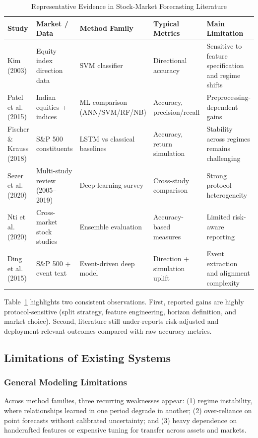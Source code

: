 \documentclass[12pt,a4paper]{article}
\begin{document}
\begin{table}[htbp]
\centering
\caption{Representative Evidence in Stock-Market Forecasting Literature}
\label{tab:literature_matrix}
\small
\begin{tabular}{@{}p{3cm}p{2.2cm}p{2.6cm}p{2.5cm}p{3cm}@{}}
\toprule
\textbf{Study} & \textbf{Market / Data} & \textbf{Method Family} & \textbf{Typical Metrics} & \textbf{Main Limitation} \\ \midrule
Kim (2003) \cite{kim2003} & Equity index direction data & SVM classifier & Directional accuracy & Sensitive to feature specification and regime shifts \\
\addlinespace
Patel et al. (2015) \cite{patel2015} & Indian equities + indices & ML comparison (ANN/SVM/RF/NB) & Accuracy, precision/recall & Preprocessing-dependent gains \\
\addlinespace
Fischer \& Krauss (2018) \cite{fischer2018} & S\&P 500 constituents & LSTM vs classical baselines & Accuracy, return simulation & Stability across regimes remains challenging \\
\addlinespace
Sezer et al. (2020) \cite{sezer2020} & Multi-study review (2005--2019) & Deep-learning survey & Cross-study comparison & Strong protocol heterogeneity \\
\addlinespace
Nti et al. (2020) \cite{nti2020review} & Cross-market stock studies & Ensemble evaluation & Accuracy-based measures & Limited risk-aware reporting \\
\addlinespace
Ding et al. (2015) \cite{ding2015} & S\&P 500 + event text & Event-driven deep model & Direction + simulation uplift & Event extraction and alignment complexity \\
\bottomrule
\end{tabular}
\end{table}

Table~\ref{tab:literature_matrix} highlights two consistent observations. First, reported gains are highly protocol-sensitive (split strategy, feature engineering, horizon definition, and market choice). Second, literature still under-reports risk-adjusted and deployment-relevant outcomes compared with raw accuracy metrics.

\subsection{Limitations of Existing Systems}

\subsubsection{General Modeling Limitations}
Across method families, three recurring weaknesses appear: (1) regime instability, where relationships learned in one period degrade in another; (2) over-reliance on point forecasts without calibrated uncertainty; and (3) heavy dependence on handcrafted features or expensive tuning for transfer across assets and markets.
\end{document}

